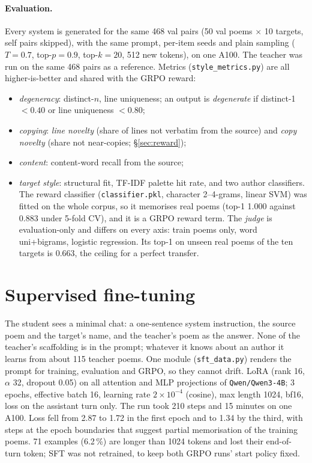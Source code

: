 \documentclass[11pt]{article}
\begin{document}
\paragraph{Evaluation.} Every system is generated for the same 468 val pairs
(50 val poems $\times$ 10 targets, self pairs skipped), with the same prompt,
per-item seeds and plain sampling ($T=0.7$, top-$p=0.9$, top-$k=20$, 512 new
tokens), on one A100. The teacher was run on the same 468 pairs as a
reference. Metrics (\texttt{style\_metrics.py}) are all higher-is-better and
shared with the GRPO reward:
\begin{itemize}\itemsep0pt
  \item \emph{degeneracy}: distinct-$n$, line uniqueness; an output is
    \emph{degenerate} if distinct-1 $<0.40$ or line uniqueness $<0.80$;
  \item \emph{copying}: \emph{line novelty} (share of lines not verbatim from
    the source) and \emph{copy novelty} (share not near-copies; \S\ref{sec:reward});
  \item \emph{content}: content-word recall from the source;
  \item \emph{target style}: structural fit, TF-IDF palette hit rate, and two
    author classifiers. The reward classifier (\texttt{classifier.pkl},
    character 2--4-grams, linear SVM) was fitted on the whole corpus, so it
    memorises real poems (top-1 1.000 against 0.883 under 5-fold CV), and it
    is a GRPO reward term. The \emph{judge} is evaluation-only and differs on
    every axis: train poems only, word uni+bigrams, logistic regression. Its
    top-1 on unseen real poems of the ten targets is 0.663, the ceiling for a
    perfect transfer.
\end{itemize}

\section{Supervised fine-tuning}\label{sec:sft}

The student sees a minimal chat: a one-sentence system instruction, the source
poem and the target's name, and the teacher's poem as the answer. None of the
teacher's scaffolding is in the prompt; whatever it knows about an author it
learns from about 115 teacher poems. One module (\texttt{sft\_data.py})
renders the prompt for training, evaluation and GRPO, so they cannot drift.
LoRA (rank 16, $\alpha$ 32, dropout 0.05) on all attention and MLP projections
of \texttt{Qwen/Qwen3-4B}; 3 epochs, effective batch 16, learning rate
$2\times10^{-4}$ (cosine), max length 1024, bf16, loss on the assistant turn
only. The run took 210 steps and 15 minutes on one A100. Loss fell from 2.87
to 1.72 in the first epoch and to 1.34 by the third, with steps at the epoch
boundaries that suggest partial memorisation of the training poems. 71
examples (6.2\,\%) are longer than 1024 tokens and lost their end-of-turn
token; SFT was not retrained, to keep both GRPO runs' start policy fixed.
\end{document}
